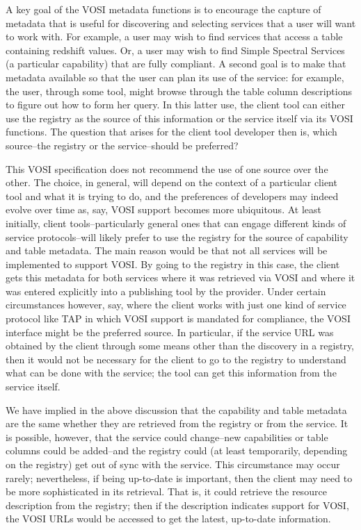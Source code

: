 \documentclass[11pt,letter]{ivoa}
\begin{document}
A key goal of the VOSI metadata functions is to encourage the capture of metadata that is useful for discovering and selecting services that a user will want to work with. For example, a user may wish to find services that access a table containing redshift values. Or, a user may wish to find Simple Spectral Services (a particular capability) that are fully compliant. A second goal is to make that metadata available so that the user can plan its use of the service: for example, the user, through some tool, might browse through the table column descriptions to figure out how to form her query. In this latter use, the client tool can either use the registry as the source of this information or the service itself via its VOSI functions. The question that arises for the client tool developer then is, which source--the registry or the service--should be preferred?

This VOSI specification does not recommend the use of one source over the other. The choice, in general, will depend on the context of a particular client tool and what it is trying to do, and the preferences of developers may indeed evolve over time as, say, VOSI support becomes more ubiquitous. At least initially, client tools--particularly general ones that can engage different kinds of service protocols--will likely prefer to use the registry for the source of capability and table metadata. The main reason would be that not all services will be implemented to support VOSI. By going to the registry in this case, the client gets this metadata for both services where it was retrieved via VOSI and where it was entered explicitly into a publishing tool by the provider. Under certain circumstances however, say, where the client works with just one kind of service protocol like TAP in which VOSI support is mandated for compliance, the VOSI interface might be the preferred source. In particular, if the service URL was obtained by the client through some means other than the discovery in a registry, then it would not be necessary for the client to go to the registry to understand what can be done with the service; the tool can get this information from the service itself. 

We have implied in the above discussion that the capability and table metadata are the same whether they are retrieved from the registry or from the service. It is possible, however, that the service could change--new capabilities or table columns could be added--and the registry could (at least temporarily, depending on the registry) get out of sync with the service. This circumstance may occur rarely; nevertheless, if being up-to-date is important, then the client may need to be more sophisticated in its retrieval. That is, it could retrieve the resource description from the registry; then if the description indicates support for VOSI, the VOSI URLs would be accessed to get the latest, up-to-date information. 
\end{document}
